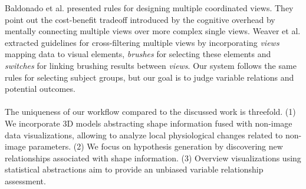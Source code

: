 \documentclass[journal]{style/vgtc} 			          %
\begin{document}
Baldonado et al. \cite{Baldonado2000} presented rules for designing multiple coordinated views.
%
They point out the cost-benefit tradeoff introduced by the cognitive overhead by mentally connecting multiple views over more complex single views. %
%
Weaver et al. \cite{Weaver2010} extracted guidelines for cross-filtering multiple views by incorporating \emph{views} mapping data to visual elements, \emph{brushes} for selecting these elements and \emph{switches} for linking brushing results between \emph{views}.
%
Our system follows the same rules for selecting subject groups, but our goal is to judge variable relations and potential outcomes.
\\\\
The uniqueness of our workflow compared to the discussed work is threefold.
%
(1) We incorporate 3D models abstracting shape information fused with non-image data visualizations, allowing to analyze local physiological changes related to non-image parameters.
%
(2) We focus on hypothesis generation by discovering new relationships associated with shape information. %
%
(3) Overview visualizations using statistical abstractions aim to provide an unbiased variable relationship assessment.

\end{document}

